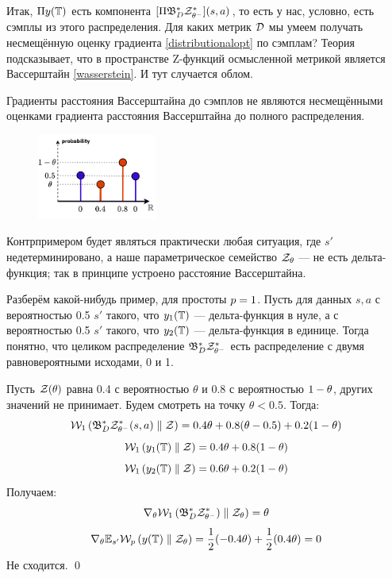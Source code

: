Итак, $\Pi y(\mathbb{T})$ есть компонента $[\Pi \mathfrak{B}^*_D \mathcal{Z}^*_{\theta^-}](s, a)$, то есть у нас, условно, есть сэмплы из этого распределения. Для каких метрик $\mathcal{D}$ мы умеем получать несмещённую оценку градиента \eqref{distributionalopt} по сэмплам? Теория подсказывает, что в пространстве Z-функций осмысленной метрикой является Вассерштайн \eqref{wasserstein}. И тут случается облом.

\begin{theorem}
Градиенты расстояния Вассерштайна до сэмплов не являются несмещёнными оценками градиента расстояния Вассерштайна до полного распределения.

\begin{figure}
\vspace{-0.3cm}
\centering
\includegraphics[width=0.35\textwidth]{Images/WassersteinSamples.png}
\vspace{-0.6cm}
\end{figure}
\beginproof[Контрпример]
Контрпримером будет являться практически любая ситуация, где $s'$ недетерминировано, а наше параметрическое семейство $\mathcal{Z}_{\theta}$ --- не есть дельта-функция; так в принципе устроено расстояние Вассерштайна.

Разберём какой-нибудь пример, для простоты $p \HM= 1$. Пусть для данных $s, a$ с вероятностью 0.5 $s'$ такого, что $y_1(\mathbb{T})$ --- дельта-функция в нуле, а с вероятностью 0.5 $s'$ такого, что $y_2(\mathbb{T})$ --- дельта-функция в единице. Тогда понятно, что целиком распределение $\mathfrak{B}^*_D \mathcal{Z}^*_{\theta^-}$ есть распределение с двумя равновероятными исходами, 0 и 1. 

Пусть $\mathcal{Z}(\theta)$ равна 0.4 с вероятностью $\theta$ и 0.8 с вероятностью $1 \HM- \theta$, других значений не принимает. Будем смотреть на точку $\theta < 0.5$. Тогда:
$$\mathcal{W}_1 \left( \mathfrak{B}^*_D \mathcal{Z}^*_{\theta^-}(s, a) \parallel \mathcal{Z} \right) = 0.4\theta + 0.8(\theta - 0.5) + 0.2(1 - \theta)$$
$$\mathcal{W}_1 \left( y_1(\mathbb{T}) \parallel \mathcal{Z} \right) = 0.4 \theta + 0.8 (1 - \theta)$$
$$\mathcal{W}_1 \left( y_2(\mathbb{T}) \parallel \mathcal{Z} \right) = 0.6 \theta + 0.2 (1 - \theta)$$
Получаем:
$$\nabla_\theta \mathcal{W}_1 \left( \mathfrak{B}^*_D \mathcal{Z}^*_{\theta^-}) \parallel \mathcal{Z}_{\theta} \right) = \theta$$
$$\nabla_\theta \mathbb{E}_{s'} \mathcal{W}_p \left( y(\mathbb{T}) \parallel \mathcal{Z}_{\theta} \right) = \frac{1}{2} (-0.4\theta) + \frac{1}{2} (0.4\theta) = 0$$
Не сходится. \qed
\end{theorem}


